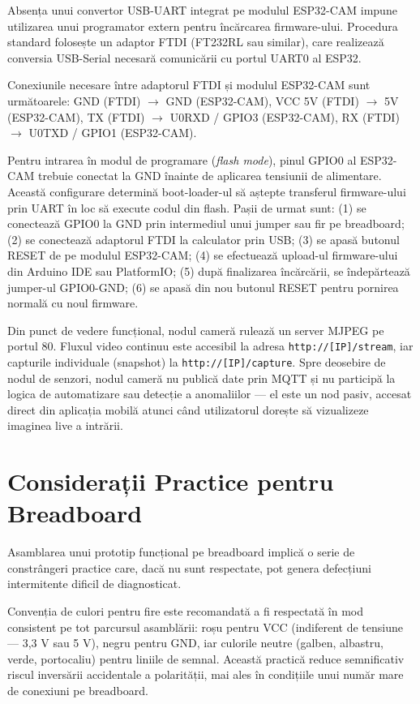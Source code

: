 \documentclass[12pt, twoside, a4paper]{report}
\begin{document}
Absența unui convertor USB-UART integrat pe modulul ESP32-CAM impune utilizarea unui
programator extern pentru încărcarea firmware-ului. Procedura standard folosește un
adaptor FTDI (FT232RL sau similar), care realizează conversia USB-Serial necesară
comunicării cu portul UART0 al ESP32.

Conexiunile necesare între adaptorul FTDI și modulul ESP32-CAM sunt următoarele:
GND (FTDI) $\rightarrow$ GND (ESP32-CAM), VCC 5V (FTDI) $\rightarrow$ 5V (ESP32-CAM),
TX (FTDI) $\rightarrow$ U0RXD / GPIO3 (ESP32-CAM), RX (FTDI) $\rightarrow$ U0TXD / GPIO1
(ESP32-CAM).

Pentru intrarea în modul de programare (\textit{flash mode}), pinul GPIO0 al ESP32-CAM
trebuie conectat la GND înainte de aplicarea tensiunii de alimentare. Această configurare
determină boot-loader-ul să aștepte transferul firmware-ului prin UART în loc să execute
codul din flash. Pașii de urmat sunt: (1) se conectează GPIO0 la GND prin intermediul
unui jumper sau fir pe breadboard; (2) se conectează adaptorul FTDI la calculator prin
USB; (3) se apasă butonul RESET de pe modulul ESP32-CAM; (4) se efectuează upload-ul
firmware-ului din Arduino IDE sau PlatformIO; (5) după finalizarea încărcării, se
îndepărtează jumper-ul GPIO0-GND; (6) se apasă din nou butonul RESET pentru pornirea
normală cu noul firmware.

Din punct de vedere funcțional, nodul cameră rulează un server MJPEG pe portul 80.
Fluxul video continuu este accesibil la adresa \texttt{http://[IP]/stream}, iar capturile
individuale (snapshot) la \texttt{http://[IP]/capture}. Spre deosebire de nodul de
senzori, nodul cameră nu publică date prin MQTT și nu participă la logica de automatizare
sau detecție a anomaliilor --- el este un nod pasiv, accesat direct din aplicația mobilă
atunci când utilizatorul dorește să vizualizeze imaginea live a intrării.

\section{Considerații Practice pentru Breadboard}

Asamblarea unui prototip funcțional pe breadboard implică o serie de constrângeri
practice care, dacă nu sunt respectate, pot genera defecțiuni intermitente dificil
de diagnosticat.

Convenția de culori pentru fire este recomandată a fi respectată în mod consistent
pe tot parcursul asamblării: roșu pentru VCC (indiferent de tensiune --- 3,3 V sau 5 V),
negru pentru GND, iar culorile neutre (galben, albastru, verde, portocaliu) pentru liniile
de semnal. Această practică reduce semnificativ riscul inversării accidentale a polarității,
mai ales în condițiile unui număr mare de conexiuni pe breadboard.
\end{document}
